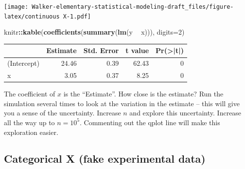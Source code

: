 \documentclass[]{book}
\newenvironment{Shaded}{\begin{snugshade}}{\end{snugshade}}
\newcommand{\KeywordTok}[1]{\textcolor[rgb]{0.13,0.29,0.53}{\textbf{#1}}}
\newcommand{\DataTypeTok}[1]{\textcolor[rgb]{0.13,0.29,0.53}{#1}}
\newcommand{\DecValTok}[1]{\textcolor[rgb]{0.00,0.00,0.81}{#1}}
\newcommand{\StringTok}[1]{\textcolor[rgb]{0.31,0.60,0.02}{#1}}
\newcommand{\OperatorTok}[1]{\textcolor[rgb]{0.81,0.36,0.00}{\textbf{#1}}}
\newcommand{\NormalTok}[1]{#1}
\theoremstyle{definition}
\theoremstyle{definition}
\theoremstyle{definition}
\theoremstyle{remark}
\begin{document}
\texttt{[image: Walker-elementary-statistical-modeling-draft\_files/figure-latex/continuous X-1.pdf]}

\begin{Shaded}
\begin{Highlighting}[]
\NormalTok{knitr}\OperatorTok{::}\KeywordTok{kable}\NormalTok{(}\KeywordTok{coefficients}\NormalTok{(}\KeywordTok{summary}\NormalTok{(}\KeywordTok{lm}\NormalTok{(y }\OperatorTok{~}\StringTok{ }\NormalTok{x))), }\DataTypeTok{digits=}\DecValTok{2}\NormalTok{)}
\end{Highlighting}
\end{Shaded}

\begin{tabular}{l|r|r|r|r}
\hline
  & Estimate & Std. Error & t value & Pr(>|t|)\\
\hline
(Intercept) & 24.46 & 0.39 & 62.43 & 0\\
\hline
x & 3.05 & 0.37 & 8.25 & 0\\
\hline
\end{tabular}

The coefficient of \(x\) is the ``Estimate''. How close is the estimate?
Run the simulation several times to look at the variation in the
estimate -- this will give you a sense of the uncertainty. Increase
\(n\) and explore this uncertainty. Increase all the way up to
\(n=10^5\). Commenting out the qplot line will make this exploration
easier.

\subsection{Categorical X (fake experimental
data)}\label{categorical-x-fake-experimental-data}
\end{document}

